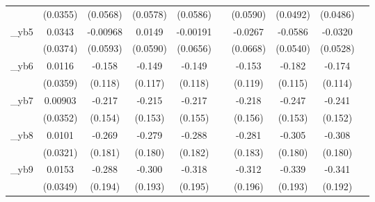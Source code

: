 \begin{table}[htbp]
\begin{tabular}{l*{9}{c}}
            &    (0.0355)         &    (0.0568)         &    (0.0578)         &    (0.0586)         &                     &    (0.0590)         &    (0.0492)         &    (0.0486)         &                     \\
[1em]
\_yb5        &      0.0343         &    -0.00968         &      0.0149         &    -0.00191         &                     &     -0.0267         &     -0.0586         &     -0.0320         &                     \\
            &    (0.0374)         &    (0.0593)         &    (0.0590)         &    (0.0656)         &                     &    (0.0668)         &    (0.0540)         &    (0.0528)         &                     \\
[1em]
\_yb6        &      0.0116         &      -0.158         &      -0.149         &      -0.149         &                     &      -0.153         &      -0.182         &      -0.174         &                     \\
            &    (0.0359)         &     (0.118)         &     (0.117)         &     (0.118)         &                     &     (0.119)         &     (0.115)         &     (0.114)         &                     \\
[1em]
\_yb7        &     0.00903         &      -0.217         &      -0.215         &      -0.217         &                     &      -0.218         &      -0.247         &      -0.241         &                     \\
            &    (0.0352)         &     (0.154)         &     (0.153)         &     (0.155)         &                     &     (0.156)         &     (0.153)         &     (0.152)         &                     \\
[1em]
\_yb8        &      0.0101         &      -0.269         &      -0.279         &      -0.288         &                     &      -0.281         &      -0.305\sym{*}  &      -0.308\sym{*}  &                     \\
            &    (0.0321)         &     (0.181)         &     (0.180)         &     (0.182)         &                     &     (0.183)         &     (0.180)         &     (0.180)         &                     \\
[1em]
\_yb9        &      0.0153         &      -0.288         &      -0.300         &      -0.318         &                     &      -0.312         &      -0.339\sym{*}  &      -0.341\sym{*}  &                     \\
            &    (0.0349)         &     (0.194)         &     (0.193)         &     (0.195)         &                     &     (0.196)         &     (0.193)         &     (0.192)         &                     \\

\end{tabular}
\end{table}

